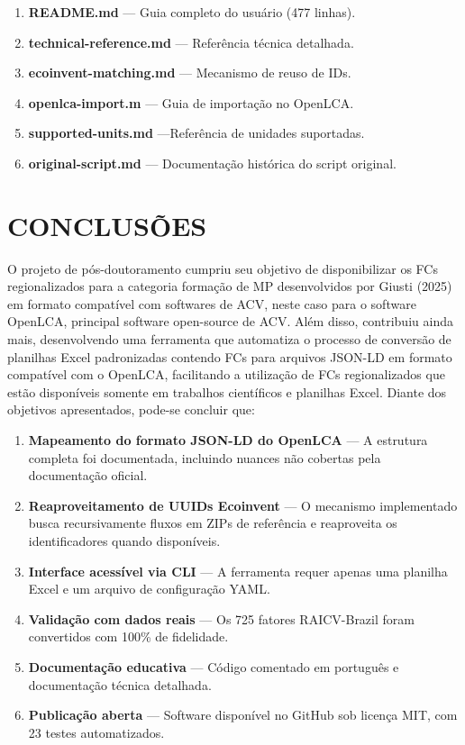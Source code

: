 \begin{enumerate}[label=\arabic*.]
    \item \textbf{README.md} --- Guia completo do usu\'ario (477 linhas).
    \item \textbf{technical-reference.md} --- Refer\^encia t\'ecnica detalhada.
    \item \textbf{ecoinvent-matching.md} --- Mecanismo de reuso de IDs.
    \item \textbf{openlca-import.m} --- Guia de importa\c{c}\~ao no OpenLCA.
    \item \textbf{supported-units.md} ---Refer\^encia de unidades suportadas.
    \item \textbf{original-script.md} --- Documenta\c{c}\~ao hist\'orica do script original.
\end{enumerate}


\section{CONCLUS\~OES}

O projeto de pós-doutoramento cumpriu seu objetivo de disponibilizar os FCs regionalizados para a categoria formação de MP desenvolvidos por Giusti (2025) em formato compatível com softwares de ACV, neste caso para o software OpenLCA, principal software open-source de ACV. Além disso, contribuiu ainda mais, desenvolvendo uma ferramenta que automatiza o processo de conversão de planilhas Excel padronizadas contendo FCs para arquivos JSON-LD em formato compatível com o OpenLCA, facilitando a utilização de FCs regionalizados que estão disponíveis somente em trabalhos científicos e planilhas Excel. Diante dos objetivos apresentados, pode-se concluir que:

\begin{enumerate}[label=\arabic*.]
    \item \textbf{Mapeamento do formato JSON-LD do OpenLCA} --- A estrutura completa foi documentada, incluindo nuances n\~ao cobertas pela documenta\c{c}\~ao oficial.
    \item \textbf{Reaproveitamento de UUIDs Ecoinvent} --- O mecanismo implementado busca recursivamente fluxos em ZIPs de refer\^encia e reaproveita os identificadores quando dispon\'iveis.
    \item \textbf{Interface acess\'ivel via CLI} --- A ferramenta requer apenas uma planilha Excel e um arquivo de configura\c{c}\~ao YAML.
    \item \textbf{Valida\c{c}\~ao com dados reais} --- Os 725 fatores RAICV-Brazil foram convertidos com 100\% de fidelidade.
    \item \textbf{Documenta\c{c}\~ao educativa} --- C\'odigo comentado em portugu\^es e documenta\c{c}\~ao t\'ecnica detalhada.
    \item \textbf{Publica\c{c}\~ao aberta} --- Software dispon\'ivel no GitHub sob licen\c{c}a MIT, com 23 testes automatizados.
\end{enumerate}

